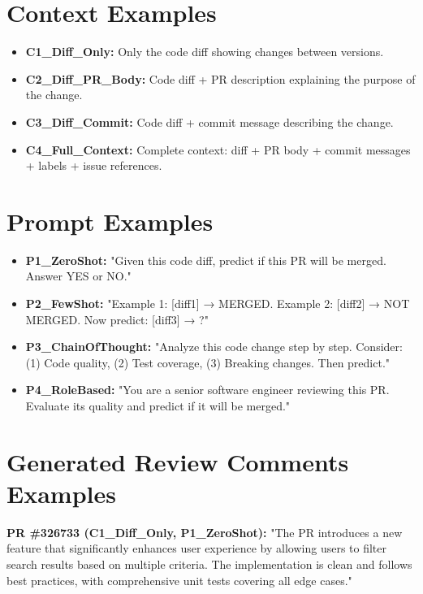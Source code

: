 \documentclass{experimentreport}
\begin{document}

\section*{Context Examples}

\begin{itemize}
\item \textbf{C1\_Diff\_Only:} Only the code diff showing changes between versions.
\item \textbf{C2\_Diff\_PR\_Body:} Code diff + PR description explaining the purpose of the change.
\item \textbf{C3\_Diff\_Commit:} Code diff + commit message describing the change.
\item \textbf{C4\_Full\_Context:} Complete context: diff + PR body + commit messages + labels + issue references.
\end{itemize}


\section*{Prompt Examples}

\begin{itemize}
\item \textbf{P1\_ZeroShot:} "Given this code diff, predict if this PR will be merged. Answer YES or NO."
\item \textbf{P2\_FewShot:} "Example 1: [diff1] → MERGED. Example 2: [diff2] → NOT MERGED. Now predict: [diff3] → ?"
\item \textbf{P3\_ChainOfThought:} "Analyze this code change step by step. Consider: (1) Code quality, (2) Test coverage, (3) Breaking changes. Then predict."
\item \textbf{P4\_RoleBased:} "You are a senior software engineer reviewing this PR. Evaluate its quality and predict if it will be merged."
\end{itemize}


\section*{Generated Review Comments Examples}

\textbf{PR \#326733 (C1\_Diff\_Only, P1\_ZeroShot):}
"The PR introduces a new feature that significantly enhances user experience by allowing users to filter search results based on multiple criteria. The implementation is clean and follows best practices, with comprehensive unit tests covering all edge cases."
\end{document}
